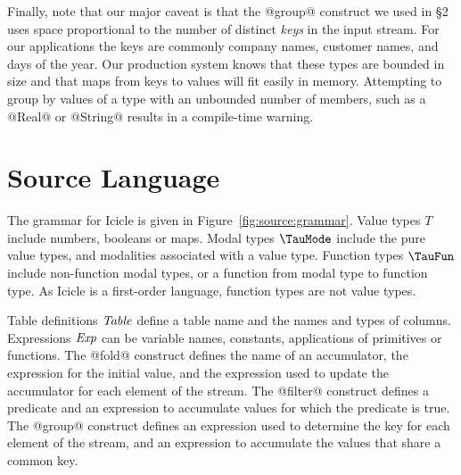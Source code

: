 Finally, note that our major caveat is that the @group@ construct we used in \S2 uses space proportional to the number of distinct \emph{keys} in the input stream.
For our applications the keys are commonly company names, customer names, and days of the year. Our production system knows that these types are bounded in size and that maps from keys to values will fit easily in memory. Attempting to group by values of a type with an unbounded number of members, such as a @Real@ or @String@ results in a compile-time warning.




\eject
\section{Source Language}
\label{s:IcicleSource}





The grammar for Icicle is given in Figure~\ref{fig:source:grammar}. Value types $T$ include numbers, booleans or maps. Modal types $\TauMode$ include the pure value types, and modalities associated with a value type. Function types $\TauFun$ include non-function modal types, or a function from modal type to function type. As Icicle is a first-order language, function types are not value types.

Table definitions $\mathit{Table}$ define a table name and the names and types of columns. Expressions $\mathit{Exp}$ can be variable names, constants, applications of primitives or functions. The @fold@ construct defines the name of an accumulator, the expression for the initial value, and the expression used to update the accumulator for each element of the stream. The @filter@ construct defines a predicate and an expression to accumulate values for which the predicate is true. The @group@ construct defines an expression used to determine the key for each element of the stream, and an expression to accumulate the values that share a common key.

